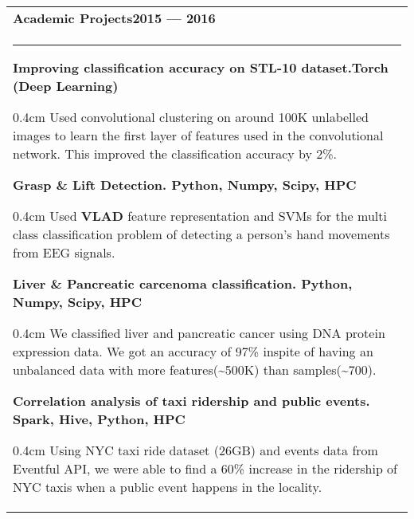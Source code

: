 \documentclass{article}
\newenvironment{projectdescription}{\begin{adjustwidth}{0.4cm}{}}{\end{adjustwidth}}
\begin{document}
\begin{tabular}{p{\dimexpr\linewidth-2\tabcolsep}}
	\bfseries \large{Academic Projects}\hfill 2015 --- 2016 \mdseries \\
	\noindent\rule{\textwidth}{0.4pt}
	\bfseries Improving classification accuracy on STL-10 dataset.\mdseries \hfill Torch (Deep Learning)

	\begin{projectdescription}
	Used convolutional clustering on around 100K unlabelled images to learn the first layer of features used in the convolutional network.  
	This improved the classification accuracy by 2\%.
	\end{projectdescription}
	\smallskip

	\bfseries Grasp \& Lift Detection. \mdseries \hfill Python, Numpy, Scipy, HPC 
	\begin{projectdescription}
	Used \textbf{VLAD} feature representation and SVMs for the multi class classification problem of detecting a person's hand movements from EEG signals.
	\end{projectdescription}
	\smallskip
	\bfseries Liver \& Pancreatic carcenoma classification.  \mdseries\hfill Python, Numpy, Scipy, HPC
	\begin{projectdescription}
		We classified liver and pancreatic cancer using DNA protein expression data.  We got an accuracy of 97\% inspite of having an unbalanced data with more features(\textasciitilde500K) than samples(\textasciitilde700).
	\end{projectdescription}

	\smallskip

	\bfseries Correlation analysis of taxi ridership and public events. \mdseries \hfill Spark, Hive, Python, HPC
	\begin{projectdescription}
			Using NYC taxi ride dataset (26GB) and events data from Eventful API, we were able to find a 60\% increase in the ridership of NYC taxis when a public event happens in the locality.
	\end{projectdescription}
\end{tabular}
\bigskip
\end{document}
